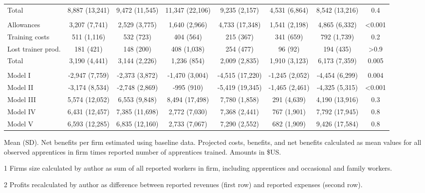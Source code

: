 \documentclass[
  11pt,
a4paper
]{article}
\begin{document}
\begin{landscape}
\begin{table}[H]
{\begin{threeparttable}
\begin{tabular}[t]{lccccccc}
\hspace{1em}Total & 8,887 (13,241) & 9,472 (11,545) & 11,347 (22,106) & 9,235 (2,157) & 4,531 (6,864) & 8,542 (13,216) & 0.4\\
\addlinespace[0.3em]
\multicolumn{8}{l}{\textbf{Projected costs}}\\
\hspace{1em}Allowances & 3,207 (7,741) & 2,529 (3,775) & 1,640 (2,966) & 4,733 (17,348) & 1,541 (2,198) & 4,865 (6,332) & <0.001\\
\hspace{1em}Training costs & 511 (1,116) & 532 (723) & 404 (564) & 215 (367) & 341 (659) & 792 (1,739) & 0.2\\
\hspace{1em}Lost trainer prod. & 181 (421) & 148 (200) & 408 (1,038) & 254 (477) & 96 (92) & 194 (435) & >0.9\\
\hspace{1em}Total & 3,190 (4,441) & 3,144 (2,226) & 1,236 (854) & 2,009 (2,835) & 1,910 (3,123) & 6,173 (7,359) & 0.005\\
\addlinespace[0.3em]
\multicolumn{8}{l}{\textbf{Net benefits}}\\
\hspace{1em}Model I & -2,947 (7,759) & -2,373 (3,872) & -1,470 (3,004) & -4,515 (17,220) & -1,245 (2,052) & -4,454 (6,299) & 0.004\\
\hspace{1em}Model II & -3,174 (8,534) & -2,748 (2,869) & -995 (910) & -5,419 (19,345) & -1,465 (2,461) & -4,325 (5,315) & <0.001\\
\hspace{1em}Model III & 5,574 (12,052) & 6,553 (9,848) & 8,494 (17,498) & 7,780 (1,858) & 291 (4,639) & 4,190 (13,916) & 0.3\\
\hspace{1em}Model IV & 6,431 (12,457) & 7,385 (11,698) & 2,772 (7,030) & 7,368 (2,441) & 767 (1,901) & 7,792 (17,945) & 0.8\\
\hspace{1em}Model V & 6,593 (12,285) & 6,835 (12,160) & 2,733 (7,067) & 7,290 (2,552) & 682 (1,909) & 9,426 (17,584) & 0.8\\
\bottomrule
\end{tabular}
\begin{tablenotes}
\small
\item Mean (SD). Net benefits per firm estimated using baseline data. 
Projected costs, benefits, and net benefits calculated as mean values for all observed apprentices in 
firm times reported number of apprentices trained. Amounts in \$US.
\item[1] Firms size calculated by author as sum of all reported workers in firm, including apprentices and occasional and family workers.
\item[2] Profits recalculated by author as difference between reported revenues (first row) and reported expenses (second row).
\end{tablenotes}
\end{threeparttable}}
\end{table}


\end{landscape}
\end{document}
